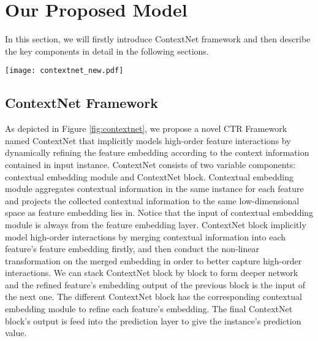 \documentclass[sigconf]{acmart}
\begin{document}
\section{Our Proposed Model}



In this section, we will firstly introduce ContextNet framework and then describe the key components in detail in the following sections.

\begin{figure*}
  \setlength{\abovecaptionskip}{0pt}
  \centering
  \texttt{[image: contextnet\_new.pdf]}
  \caption{The Neural Structure of ContextNet  Framework}
  \label{fig:contextnet}
\end{figure*}

\subsection{ContextNet Framework}
As depicted in Figure \ref{fig:contextnet},  we propose a novel CTR Framework named ContextNet that implicitly models high-order feature interactions by dynamically refining the feature embedding according to the context information contained in input instance. ContextNet consists of two variable components: contextual embedding module and ContextNet block. Contextual embedding module aggregates contextual information in the same instance for each feature and projects the collected contextual information to the same low-dimensional space as feature embedding lies in. Notice that the input of contextual embedding module is always from the feature embedding layer. ContextNet block implicitly model high-order interactions by merging contextual information into each feature's feature embedding firstly, and then conduct the non-linear transformation on the merged embedding in order to  better capture high-order interactions. We can stack ContextNet  block by block to form deeper network and the refined feature's embedding output of the previous block is the input of the next one. The different ContextNet block has the corresponding contextual embedding module to refine each feature’s embedding. The final ContextNet block’s output is feed into the prediction layer to give the instance's prediction value.
\end{document}
